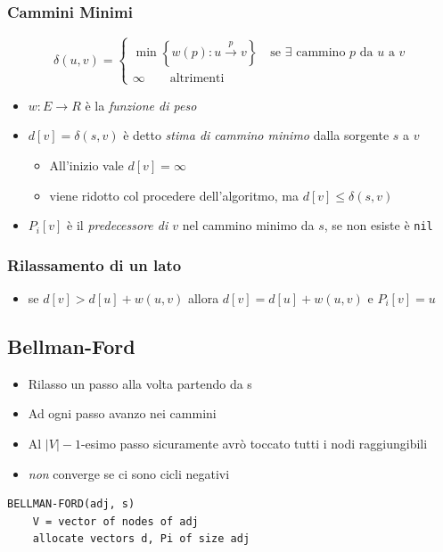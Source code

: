 \documentclass[10pt,a4paper]{article}
\newcommand{\code}{\texttt}
\begin{document}
\begin{multicols*}{2}
\subsubsection*{Cammini Minimi}
\begin{equation*}
    \delta(u,v) = \begin{cases}
        \min\left\{w(p): u\xrightarrow p v\right\} \quad \text{se $\exists$ cammino $p$ da $u$ a $v$}\\
        \infty \qquad \text{altrimenti}
    \end{cases}
\end{equation*}
\begin{itemize}
    \item $w: E \rightarrow R$ è la \emph{funzione di peso}
    \item $d[v] = \delta(s, v)$ è detto \emph{stima di cammino minimo} dalla sorgente $s$ a $v$ 
    \begin{itemize}
        \item All'inizio vale $d[v] = \infty$
        \item viene ridotto col procedere dell'algoritmo, ma $d[v] \le \delta(s, v)$
    \end{itemize}
    \item $P_i[v]$ è il \emph{predecessore di $v$} nel cammino minimo da $s$, se non esiste è \code{nil}
\end{itemize}

\subsubsection*{Rilassamento di un lato}
\begin{itemize}
    \item se $d[v] > d[u]+w(u,v)$ allora $d[v] = d[u] + w(u,v)$ e $P_i[v]=u$
\end{itemize}

\columnbreak

\subsection*{Bellman-Ford}
\begin{itemize}
    \item Rilasso un passo alla volta partendo da s
    \item Ad ogni passo avanzo nei cammini
    \item Al $|V| - 1$-esimo passo sicuramente avrò toccato tutti i nodi raggiungibili
    \item \emph{non} converge se ci sono cicli negativi
\end{itemize}
\begin{lstlisting}
BELLMAN-FORD(adj, s)
    V = vector of nodes of adj
    allocate vectors d, Pi of size adj


\end{lstlisting}
\end{multicols*}
\end{document}
